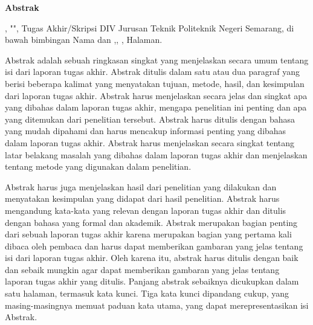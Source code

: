 
\clearpage
{}
{}
\begin{center}
    \textbf{\large Abstrak}\\[3em]
\end{center}
\noindent {\penulis}, "{\judulid}", Tugas Akhir/Skripsi DIV Jurusan Teknik {\jurusan} Politeknik Negeri Semarang, di bawah bimbingan Nama {\pembimbingsatu} dan {\pembimbingdua},{\bulan}, {\tahun}, \pageref{LastPage} Halaman.

Abstrak adalah sebuah ringkasan singkat yang menjelaskan secara umum tentang isi dari laporan tugas akhir. Abstrak ditulis dalam satu atau dua paragraf yang berisi beberapa kalimat yang menyatakan tujuan, metode, hasil, dan kesimpulan dari laporan tugas akhir. Abstrak harus menjelaskan secara jelas dan singkat apa yang dibahas dalam laporan tugas akhir, mengapa penelitian ini penting dan apa yang ditemukan dari penelitian tersebut. Abstrak harus ditulis dengan bahasa yang mudah dipahami dan harus mencakup informasi penting yang dibahas dalam laporan tugas akhir. Abstrak harus menjelaskan secara singkat tentang latar belakang masalah yang dibahas dalam laporan tugas akhir dan menjelaskan tentang metode yang digunakan dalam penelitian.

Abstrak harus juga menjelaskan hasil dari penelitian yang dilakukan dan menyatakan kesimpulan yang didapat dari hasil penelitian. Abstrak harus mengandung kata-kata yang relevan dengan laporan tugas akhir dan ditulis dengan bahasa yang formal dan akademik. Abstrak merupakan bagian penting dari sebuah laporan tugas akhir karena merupakan bagian yang pertama kali dibaca oleh pembaca dan harus dapat memberikan gambaran yang jelas tentang isi dari laporan tugas akhir. Oleh karena itu, abstrak harus ditulis dengan baik dan sebaik mungkin agar dapat memberikan gambaran yang jelas tentang laporan tugas akhir yang ditulis. Panjang abstrak sebaiknya dicukupkan dalam satu halaman, termasuk kata kunci. Tiga kata kunci dipandang cukup, yang masing-masingnya memuat paduan kata utama, yang dapat merepresentasikan isi Abstrak.\\[0.6cm]

